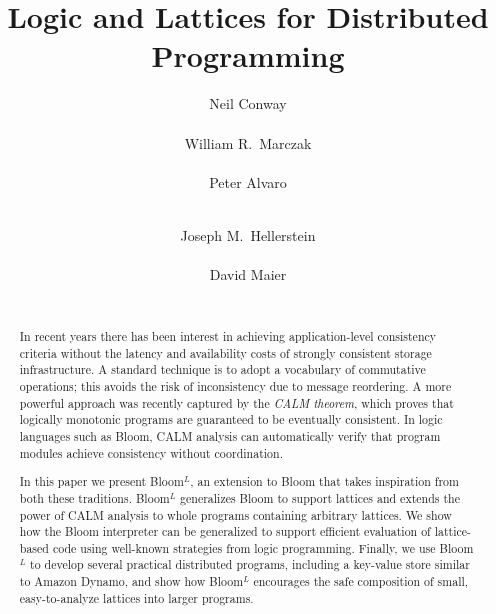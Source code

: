 \documentclass{sig-alternate}
\def\lang{Bloom$^L$\xspace}
\begin{document}
\title{Logic and Lattices for Distributed Programming}


\author{
\alignauthor
Neil Conway\\
       \\
\alignauthor
William R.\ Marczak\\
       \\
\alignauthor
Peter Alvaro\\
       \\
\and
\alignauthor
Joseph M.\ Hellerstein\\
       \\
\alignauthor
David Maier\\
       \\
}

\maketitle

\begin{abstract}
  In recent years there has been interest in achieving application-level
  consistency criteria without the latency and availability costs of strongly
  consistent storage infrastructure. A standard technique
  is to adopt a vocabulary of
  commutative operations; this avoids the risk of inconsistency due to message
  reordering.  A more powerful approach was recently captured by the \emph{CALM
    theorem}, which proves that logically monotonic programs are guaranteed to
  be eventually consistent. 
  In logic languages such as Bloom, CALM analysis can automatically verify that program modules achieve consistency without coordination.

  In this paper we present \lang, an extension to Bloom that takes inspiration
  from both these traditions.  
  \lang generalizes Bloom to support lattices
  and extends the power of CALM analysis to whole programs containing arbitrary
  lattices. We show how the Bloom interpreter can be generalized to support
  efficient evaluation of lattice-based code using well-known strategies from
  logic programming.  Finally, we use \lang to develop several practical
  distributed programs, including a key-value store similar to Amazon Dynamo,
  and show how \lang encourages the safe composition of small, easy-to-analyze
  lattices into larger programs.
\end{abstract}










%


\balance



% 
\end{document}
